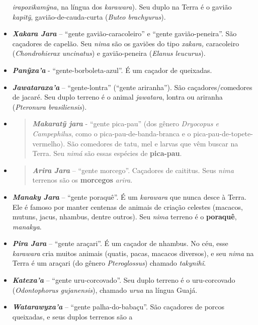 \begin{itemize}
  \emph{irapoxikamỹna}, na língua dos \emph{karawara}). Seu duplo na
  Terra é o gavião \emph{kapitỹ}, gavião-de-cauda-curta (\emph{Buteo
  brachyurus}).
\item
  \emph{\textbf{Xakara Jara}} -- ``gente gavião-caracoleiro'' e ``gente
  gavião-peneira''. São caçadores de capelão. Seu \emph{nima} são os
  gaviões do tipo \emph{xakara,} caracoleiro (\emph{Chondrohierax
  uncinatus}) e gavião-peneira (\emph{Elanus leucurus}).
\item
  \emph{\textbf{Panỹxa'a}} - ``gente-borboleta-azul''. É um caçador de
  queixadas.
\item
  \emph{\textbf{Jawataraxa'a}} -- ``gente-lontra'' (``gente ariranha'').
  São caçadores/comedores de jacaré. Seu duplo terreno é o animal
  \emph{jawatara}, lontra ou ariranha (\emph{Pteronura brasiliensis}).
\item
  \begin{quote}
  \emph{\textbf{Makaratỹ jara}} - ``gente pica-pau'' (dos gênero
  \emph{Dryocopus e Campephilus}, como o pica-pau-de-banda-branca e o
  pica-pau-de-topete-vermelho). São comedores de tatu, mel e larvas que
  vêm buscar na Terra. Seu \emph{nimá} são essas espécies de
  \textbf{pica-pau}.
  \end{quote}
\item
  \begin{quote}
  \textbf{\emph{Arira} \emph{Jara}} -- ``gente morcego''. Caçadores de
  caititus. Seus \emph{nima} terrenos são os \textbf{morcegos}
  \emph{arira}.
  \end{quote}
\item
  \emph{\textbf{Manaky Jara}} -- ``gente poraquê''. É um \emph{karawara}
  que nunca desce à Terra. Ele é famoso por manter centenas de animais
  de criação celestes (macacos, mutuns, jacus, nhambus, dentre outros).
  Seu \emph{nima} terreno é o \textbf{poraquê}, \emph{manakya}.
\item
  \emph{\textbf{Pira Jara}} -- ``gente araçari''. É um caçador de
  nhambus. No céu, esse \emph{karawara} cria muitos animais (quatis,
  pacas, macacos diversos), e seu \emph{nima} na Terra é um araçari (do
  gênero \emph{Pteroglossus}) chamado \emph{takynihĩ}.
\item
  \emph{\textbf{Katexa'a}} -- ``gente uru-corcovado''. Seu duplo terreno
  é o uru-corcovado (\emph{Odontophorus gujanensis}), chamado
  \emph{urua} na língua Guajá.
\item
  \emph{\textbf{Watarawyxa'a}} -- ``gente palha-do-babaçu''. São
  caçadores de porcos queixadas, e seus duplos terrenos são a

\end{itemize}
